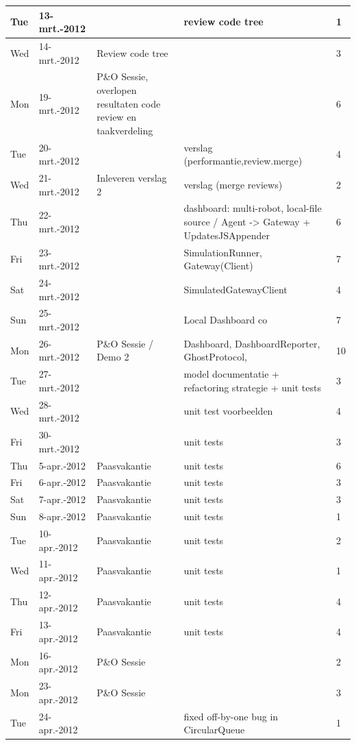 \documentclass[12pt,a4paper]{report}
\begin{document}
\begin{landscape}
\begin{longtable}{llp{7cm}p{10cm}l}
\hline
Tue & 13-mrt.-2012 &  & review code tree & 1 \\ 
\hline
Wed & 14-mrt.-2012 & Review code tree  &  & 3 \\ 
\hline
Mon & 19-mrt.-2012 & P\&O Sessie, overlopen resultaten code review en taakverdeling &  & 6 \\ 
\hline
Tue & 20-mrt.-2012 &  & verslag (performantie,review.merge) & 4 \\ 
\hline
Wed & 21-mrt.-2012 & Inleveren verslag 2 & verslag (merge reviews) & 2 \\ 
\hline
Thu & 22-mrt.-2012 &  & dashboard: multi-robot, local-file source / Agent -> Gateway + UpdatesJSAppender & 6 \\ 
\hline
Fri & 23-mrt.-2012 &  & SimulationRunner, Gateway(Client) & 7 \\ 
\hline
Sat & 24-mrt.-2012 &  & SimulatedGatewayClient & 4 \\ 
\hline
Sun & 25-mrt.-2012 &  & Local Dashboard  co & 7 \\ 
\hline
Mon & 26-mrt.-2012 & P\&O Sessie / Demo 2 & Dashboard, DashboardReporter, GhostProtocol,  & 10 \\ 
\hline
Tue & 27-mrt.-2012 &  & model documentatie + refactoring strategie + unit tests & 3 \\ 
\hline
Wed & 28-mrt.-2012 &  & unit test voorbeelden & 4 \\ 
\hline
Fri & 30-mrt.-2012 &  & unit tests & 3 \\ 
\hline
Thu & 5-apr.-2012 & Paasvakantie & unit tests & 6 \\ 
\hline
Fri & 6-apr.-2012 & Paasvakantie & unit tests & 3 \\ 
\hline
Sat & 7-apr.-2012 & Paasvakantie & unit tests & 3 \\ 
\hline
Sun & 8-apr.-2012 & Paasvakantie & unit tests & 1 \\ 
\hline
Tue & 10-apr.-2012 & Paasvakantie & unit tests & 2 \\ 
\hline
Wed & 11-apr.-2012 & Paasvakantie & unit tests & 1 \\ 
\hline
Thu & 12-apr.-2012 & Paasvakantie & unit tests & 4 \\ 
\hline
Fri & 13-apr.-2012 & Paasvakantie & unit tests & 4 \\ 
\hline
Mon & 16-apr.-2012 & P\&O Sessie &  & 2 \\ 
\hline
Mon & 23-apr.-2012 & P\&O Sessie &  & 3 \\ 
\hline
Tue & 24-apr.-2012 &  & fixed off-by-one bug in CircularQueue & 1 \\ 

\end{longtable}
\end{landscape}
\end{document}
